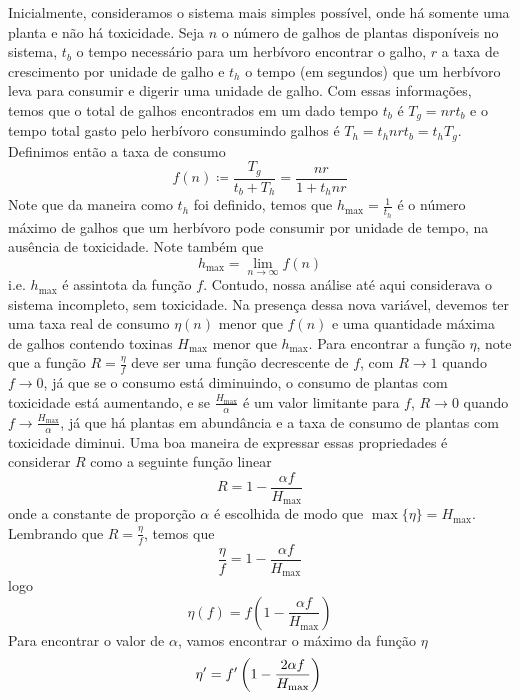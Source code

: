 \documentclass{article}
\begin{document}
Inicialmente, consideramos o sistema mais simples possível, onde há somente uma planta e não há toxicidade. Seja $n$ o número de galhos de plantas disponíveis no sistema, $t_b$ o tempo necessário para um herbívoro encontrar o galho, $r$ a taxa de crescimento por unidade de galho e $t_h$ o tempo (em segundos) que um herbívoro leva para consumir e digerir uma unidade de galho. Com essas informações, temos que o total de galhos encontrados em um dado tempo $t_b$ é $T_g = n r t_b$ e o tempo total gasto pelo herbívoro consumindo galhos é $T_h = t_h n r t_b = t_h T_g$. Definimos então a taxa de consumo
\begin{equation}
    f(n) \coloneqq \frac{T_g}{t_b + T_h} = \frac{n r}{1 + t_h n r}
\end{equation}
Note que da maneira como $t_h$ foi definido, temos que $h_{\max} = \frac{1}{t_h}$ é o número máximo de galhos que um herbívoro pode consumir por unidade de tempo, na ausência de toxicidade. Note também que
\begin{equation}
    h_{\max} = \lim_{n \to \infty} f(n)
\end{equation}
i.e. $h_{\max}$ é assintota da função $f$. Contudo, nossa análise até aqui considerava o sistema incompleto, sem toxicidade. Na presença dessa nova variável, devemos ter uma taxa real de consumo $\eta(n)$ menor que $f(n)$ e uma quantidade máxima de galhos contendo toxinas $H_{\max}$ menor que $h_{\max}$. Para encontrar a função $\eta$, note que a função $R = \frac{\eta}{f}$ deve ser uma função decrescente de $f$, com $R \to 1$ quando $f \to 0$, já que se o consumo está diminuindo, o consumo de plantas com toxicidade está aumentando, e se $\frac{H_{\max}}{\alpha}$ é um valor limitante para $f$, $R \to 0$ quando $f \to \frac{H_{\max}}{\alpha}$, já que há plantas em abundância e a taxa de consumo de plantas com toxicidade diminui. Uma boa maneira de expressar essas propriedades é considerar $R$ como a seguinte função linear \[ R = 1 - \frac{\alpha f}{H_{\max}} \] onde a constante de proporção $\alpha$ é escolhida de modo que $\max\{\eta\} = H_{\max}$. Lembrando que $R = \frac{\eta}{f}$, temos que
\begin{equation*}
    \frac{\eta}{f} = 1 - \frac{\alpha f}{H_{\max}}
\end{equation*}
logo
\begin{equation}
    \eta(f) = f\left(1 - \frac{\alpha f}{H_{\max}}\right)
\end{equation}
Para encontrar o valor de $\alpha$, vamos encontrar o máximo da função $\eta$
\begin{equation*}
    \eta' = f'\left(1 - \frac{2 \alpha f}{H_{\max}}\right) \\
\end{equation*}
\end{document}
